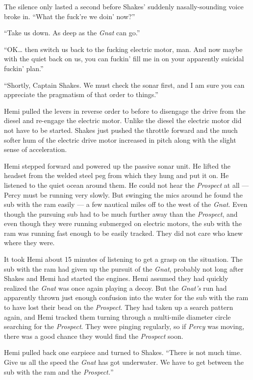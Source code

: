 \documentclass[
]{scrbook}
\begin{document}
The silence only lasted a second before Shakes' suddenly
nasally-sounding voice broke in. ``What the fuck're we doin' now?''

``Take us down. As deep as the \emph{Gnat} can go.''

``OK\ldots{} then switch us back to the fucking electric motor, man. And
now maybe with the quiet back on us, you can fuckin' fill me in on your
apparently suicidal fuckin' plan.''

``Shortly, Captain Shakes. We must check the sonar first, and I am sure
you can appreciate the pragmatism of that order to things.''

Hemi pulled the levers in reverse order to before to disengage the drive
from the diesel and re-engage the electric motor. Unlike the diesel the
electric motor did not have to be started. Shakes just pushed the
throttle forward and the much softer hum of the electric drive motor
increased in pitch along with the slight sense of acceleration.

Hemi stepped forward and powered up the passive sonar unit. He lifted
the headset from the welded steel peg from which they hung and put it
on. He listened to the quiet ocean around them. He could not hear the
\emph{Prospect} at all --- Percy must be running very slowly. But
swinging the mics around he found the sub with the ram easily --- a few
nautical miles off to the west of the \emph{Gnat}. Even though the
pursuing sub had to be much further away than the \emph{Prospect}, and
even though they were running submerged on electric motors, the sub with
the ram was running fast enough to be easily tracked. They did not care
who knew where they were.

It took Hemi about 15 minutes of listening to get a grasp on the
situation. The sub with the ram had given up the pursuit of the
\emph{Gnat}, probably not long after Shakes and Hemi had started the
engines. Hemi assumed they had quickly realized the \emph{Gnat} was once
again playing a decoy. But the \emph{Gnat's} run had apparently thrown
just enough confusion into the water for the sub with the ram to have
lost their bead on the \emph{Prospect}. They had taken up a search
pattern again, and Hemi tracked them turning through a multi-mile
diameter circle searching for the \emph{Prospect}. They were pinging
regularly, so if \emph{Percy} was moving, there was a good chance they
would find the \emph{Prospect} soon.

Hemi pulled back one earpiece and turned to Shakes. ``There is not much
time. Give us all the speed the \emph{Gnat} has got underwater. We have
to get between the sub with the ram and the \emph{Prospect.}''
\end{document}
